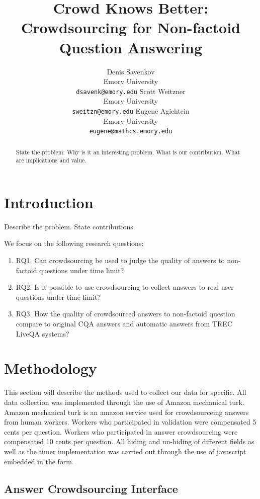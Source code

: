 \documentclass[11pt,letterpaper]{article}
\title{Crowd Knows Better: Crowdsourcing for Non-factoid Question Answering}
\author{Denis Savenkov \\ Emory University \\ {\tt dsavenk@emory.edu} 
  \And Scott Weitzner \\ Emory University \\ {\tt sweitzn@emory.edu}
  \And Eugene Agichtein \\ Emory University \\ {\tt eugene@mathcs.emory.edu}
}
\date{}
\begin{document}
\maketitle

\begin{abstract}
State the problem.
Why is it an interesting problem.
What is our contribution.
What are implications and value.
\end{abstract}

\section{Introduction}
\label{sec:introduction}

Describe the problem.
State contributions.

We focus on the following research questions:
\begin{enumerate}
\item RQ1. Can crowdsourcing be used to judge the quality of answers to non-factoid questions under time limit?
\item RQ2. Is it possible to use crowdsourcing to collect answers to real user questions under time limit?
\item RQ3. How the quality of crowdsourced answers to non-factoid question compare to original CQA answers and automatic answers from TREC LiveQA systems?
\end{enumerate}


\section{Methodology}
\label{sec:methodology}

This section will describe the methods used to collect our data for specific. All data collection was implemented through the use of Amazon mechanical turk. Amazon mechanical turk is an amazon service used for crowdsourceing answers from human workers. Workers who participated in validation were compensated 5 cents per question. Workers who participated in answer crowdsourcing were compensated 10 cents per question. All hiding and un-hiding of different fields as well as the timer implementation was carried out through the use of javascript embedded in the form.

\subsection{Answer Crowdsourcing Interface}
\label{subsec:interface}
\end{document}

